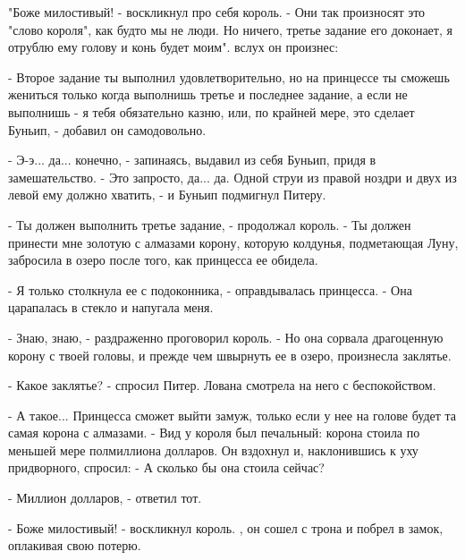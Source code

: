 \par"Боже милостивый! - воскликнул про себя король. - Они так 
произносят это "слово короля", как будто мы не люди. Но ничего, третье 
задание его доконает, я отрублю ему голову и конь будет моим".
 вслух он произнес:
\par- Второе задание ты выполнил удовлетворительно, но на принцессе ты 
сможешь жениться только когда выполнишь третье и последнее задание, а 
если не выполнишь - я тебя обязательно казню, или, по крайней мере, 
это сделает Буньип, - добавил он самодовольно.
\par- Э-э... да... конечно, - запинаясь, выдавил из себя Буньип, придя 
в замешательство. - Это запросто, да... да. Одной струи из правой 
ноздри и двух из левой ему должно хватить, - и Буньип подмигнул 
Питеру.
\par- Ты должен выполнить третье задание, - продолжал король. - Ты 
должен принести мне золотую с алмазами корону, которую колдунья, 
подметающая Луну, забросила в озеро после того, как принцесса ее 
обидела.
\par- Я только столкнула ее с подоконника, - оправдывалась принцесса. 
- Она царапалась в стекло и напугала меня.
\par- Знаю, знаю, - раздраженно проговорил король. - Но она сорвала 
драгоценную корону с твоей головы, и прежде чем швырнуть ее в озеро, 
произнесла заклятье.
\par- Какое заклятье? - спросил Питер. Лована смотрела на него с 
беспокойством.
\par- А такое... Принцесса сможет выйти замуж, только если у нее на 
голове будет та самая корона с алмазами. - Вид у короля был печальный: 
корона стоила по меньшей мере полмиллиона долларов. Он вздохнул и, 
наклонившись к уху придворного, спросил: - А сколько бы она стоила 
сейчас?
\par- Миллион долларов, - ответил тот.
\par- Боже милостивый! - воскликнул король.
, он сошел с трона и побрел в замок, оплакивая свою потерю.
